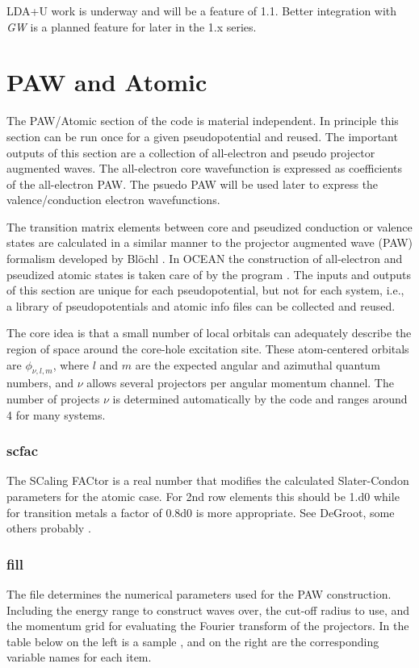 \documentclass[11pt]{report}
\begin{document}
LDA+U work is underway and will be a feature of  1.1. Better integration with {\it GW} is a planned feature for later in the 1.x series. 


\chapter{PAW and Atomic}
\label{paw}

The PAW/Atomic section of the code is material independent. In principle this section can be run once
for a given pseudopotential and reused. The important outputs of this section are a collection of 
all-electron and pseudo projector augmented waves. The all-electron core wavefunction is expressed
as coefficients of the all-electron PAW. The psuedo PAW will be used later to express the valence/conduction
electron wavefunctions.

The transition matrix elements between core and pseudized conduction or valence states are calculated 
in a similar manner to the projector augmented wave (PAW) formalism developed by Bl\"{o}chl \cite{PhysRevB.50.17953}. In OCEAN
the construction of all-electron and pseudized atomic states is taken care of by the program . 
The inputs and outputs of this section are unique for each pseudopotential, but not for each system, i.e., 
a library of pseudopotentials and atomic info files can be collected and reused.

The core idea is that a small number of local orbitals can adequately describe the region of space around the 
core-hole excitation site. These atom-centered orbitals are $\phi_{\nu,l,m}$, where $l$ and $m$ are the 
expected angular and azimuthal quantum numbers, and $\nu$ allows several projectors per angular momentum channel. 
The number of projects $\nu$ is determined automatically by the code and ranges around 4 for many systems. 

\subsection{scfac}
The SCaling FACtor is a real number that modifies the calculated Slater-Condon parameters for the atomic case. For 2nd row elements this should be 1.d0 while for transition metals a factor of 0.8d0 is more appropriate. See DeGroot, some others probably \cite{degroot.book}.

\subsection{fill}
\label{fill}
The  file determines the numerical parameters used for the PAW construction. Including the energy range to construct waves over,
the cut-off radius to use, and the momentum grid for evaluating the Fourier transform of the projectors. 
In the table below on the left is a sample , and on the right are the corresponding variable names for each item.
\end{document}
